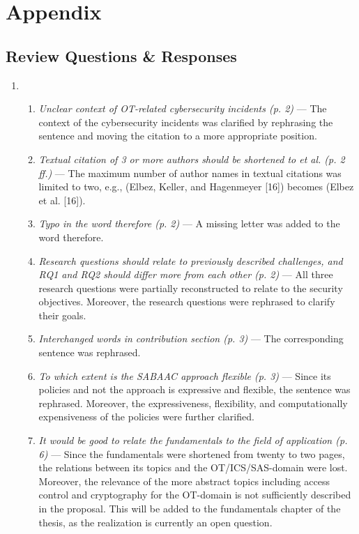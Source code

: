 \chapter{Appendix}
\label{chap:appendix}
\section{Review Questions \& Responses}
\begin{enumerate}[label=R\arabic*.]
    \item \begin{enumerate}[label=Q\arabic*.]
        \item \textit{Unclear context of OT-related cybersecurity incidents (p. 2)} --- The context of the cybersecurity incidents was clarified by rephrasing the sentence and moving the citation to a more appropriate position.
        \item \textit{Textual citation of 3 or more authors should be shortened to et al. (p. 2 ff.)} --- The maximum number of author names in textual citations was limited to two, e.g., (Elbez, Keller, and Hagenmeyer [16]) becomes (Elbez et al. [16]).
        \item \textit{Typo in the word therefore (p. 2)} --- A missing letter was added to the word therefore.
        \item \textit{Research questions should relate to previously described challenges, and RQ1 and RQ2 should differ more from each other (p. 2)} --- All three research questions were partially reconstructed to relate to the security objectives. Moreover, the research questions were rephrased to clarify their goals.
        \item \textit{Interchanged words in contribution section (p. 3)} --- The corresponding sentence was rephrased.
        \item \textit{To which extent is the SABAAC approach flexible (p. 3)} --- Since its policies and not the approach is expressive and flexible, the sentence was rephrased. Moreover, the expressiveness, flexibility, and computationally expensiveness of the policies were further clarified.
        \item \textit{It would be good to relate the fundamentals to the field of application (p. 6)} --- Since the fundamentals were shortened from twenty to two pages, the relations between its topics and the OT/ICS/SAS-domain were lost. Moreover, the relevance of the more abstract topics including access control and cryptography for the OT-domain is not sufficiently described in the proposal. This will be added to the fundamentals chapter of the thesis, as the realization is currently an open question.

\end{enumerate}
\end{enumerate}
